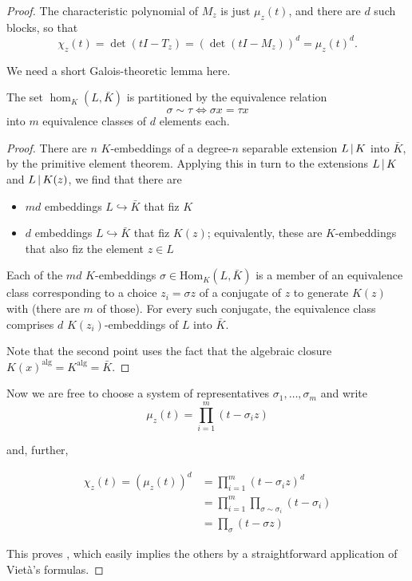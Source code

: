 \begin{proof}
  The characteristic polynomial of $M_z$ is just $\mu_z(t)$, and there are $d$ such blocks, so that 
  \[ \chi_z(t) = \det(tI - T_z) = (\det (tI - M_z))^d = \mu_z(t)^d. \]

  We need a short Galois-theoretic lemma here.
  
  \begin{lemma}
  The set $\hom_K(L,\bar K)$ is partitioned by the equivalence relation \[ \sigma \sim \tau \iff \sigma x = \tau x \]
  into $m$ equivalence classes of $d$ elements each.
  \end{lemma}

  \begin{proof}
  There are $n$ $K$-embeddings of a degree-$n$ separable extension
  $L \mathop{|} K$ into $\bar K$, by the primitive element theorem.
  Applying this in turn to the extensions $L \mathop{|} K$ and
  $L \mathop{|} K(z)$, we find that there are
  
  \begin{itemize} 
    \item $md$ embeddings $L \hookrightarrow \bar K$ that fiz $K$ 
    \item $d$ embeddings $L \hookrightarrow \bar K$ that fiz $K(z)$;
      equivalently, these are $K$-embeddings that also fiz the element $z\in L$ 
  \end{itemize}

  Each of the $md$ $K$-embeddings $\sigma \in {\mathrm{Hom}}_K(L,\bar K)$ is a
  member of an equivalence class corresponding to a choice $z_i = \sigma z$ of
  a conjugate of $z$ to generate $K(z)$ with (there are $m$ of those). For
  every such conjugate, the equivalence class comprises $d$ $K(z_i)$-embeddings
  of $L$ into $\bar K$.

  Note that the second point uses the fact that the algebraic closure
  ${K(x)}^{\mathrm{alg}} = K^{\mathrm{alg}} = \bar K$.
  \end{proof}

  Now we are free to choose a system of representatives $\sigma_1,\ldots,\sigma_m$ and write
  \[ \mu_z(t) = \prod_{i=1}^m (t - \sigma_i z) \]

  and, further,

  \begin{align*}
    \chi_z(t) = (\mu_z(t))^d &= \prod_{i=1}^m (t-\sigma_i z)^d \\
                             &= \prod_{i=1}^m \prod_{\sigma\sim\sigma_i} (t-\sigma_i) \\
                             &= \prod_{\sigma} (t-\sigma z)
  \end{align*}
  
  This proves , which easily implies the others by a
  straightforward application of Viet\`a's formulas.
\end{proof}

